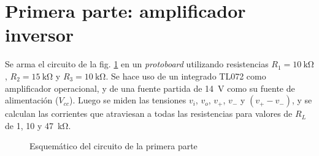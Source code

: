 \section{Primera parte: amplificador inversor}

Se arma el circuito de la fig. \ref{fig:1:esquema} en un \textit{protoboard}
utilizando resistencias $R_1 = \SI{10}{\kilo\ohm}$, $R_2 = \SI{15}{\kilo\ohm}$ y
$R_3 = \SI{10}{\kilo\ohm}$. Se hace uso de un integrado TL072 como amplificador
operacional, y de una fuente partida de \SI{14}{\volt} como su fuente de 
alimentación ($V_{cc}$). Luego se miden las tensiones $v_i$, $v_o$, $v_{+}$,
$v_{-}$ y $\left(v_{+} - v_{-}\right)$, y se calculan las corrientes que
atraviesan a todas las resistencias para valores de $R_L$ de 1, 10 y
\SI{47}{\kilo\ohm}.

\begin{figure}[H]
    \centering
    
    \caption{Esquemático del circuito de la primera parte}
    \label{fig:1:esquema}
\end{figure}







% 
